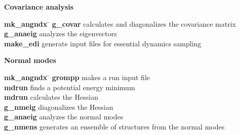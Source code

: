 \begin{description}
\item {\large\bf Covariance analysis}
\vspace{-2ex}\begin{tabbing}
{\bf mk\_angndx} \= \kill
{\bf g\_covar} \> calculates and diagonalizes the covariance matrix \\
{\bf g\_anaeig} \> analyzes the eigenvectors \\
{\bf make\_edi} \> generate input files for essential dynamics sampling \\
\end{tabbing}\vspace{-2ex}

\item {\large\bf Normal modes}
\vspace{-2ex}\begin{tabbing}
{\bf mk\_angndx} \= \kill
{\bf grompp} \> makes a run input file \\
{\bf mdrun} \> finds a potential energy minimum \\
{\bf mdrun} \> calculates the Hessian \\
{\bf g\_nmeig} \> diagonalizes the Hessian  \\
{\bf g\_anaeig} \> analyzes the normal modes \\
{\bf g\_nmens} \> generates an ensemble of structures from the normal modes \\
\end{tabbing}\vspace{-2ex}

\end{description}
